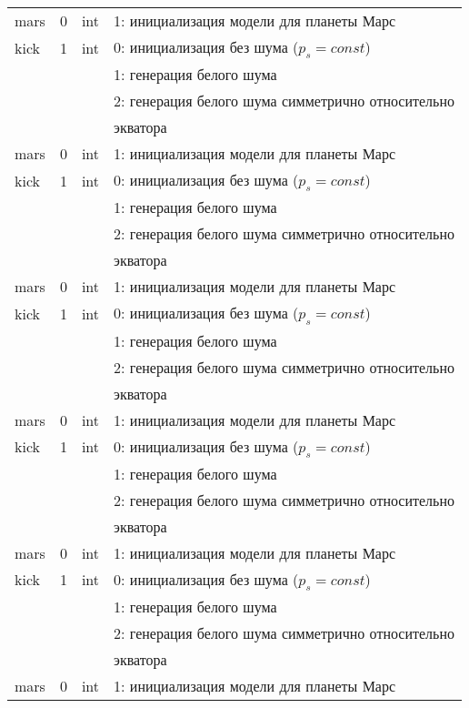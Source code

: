 \begin{longtable}[c]{|l|c|l|l|}
     mars & 0 & int & 1: инициализация модели для планеты Марс     \\
    kick & 1 & int & 0: инициализация без шума (\(p_s = const\)) \\
          &   &     & 1: генерация белого шума                  \\
          &   &     & 2: генерация белого шума симметрично относительно \\
      & & & экватора    \\
     mars & 0 & int & 1: инициализация модели для планеты Марс     \\
    kick & 1 & int & 0: инициализация без шума (\(p_s = const\)) \\
          &   &     & 1: генерация белого шума                  \\
          &   &     & 2: генерация белого шума симметрично относительно \\
      & & & экватора    \\
     mars & 0 & int & 1: инициализация модели для планеты Марс     \\
    kick & 1 & int & 0: инициализация без шума (\(p_s = const\)) \\
          &   &     & 1: генерация белого шума                  \\
          &   &     & 2: генерация белого шума симметрично относительно \\
      & & & экватора    \\
     mars & 0 & int & 1: инициализация модели для планеты Марс     \\
    kick & 1 & int & 0: инициализация без шума (\(p_s = const\)) \\
          &   &     & 1: генерация белого шума                  \\
          &   &     & 2: генерация белого шума симметрично относительно \\
      & & & экватора    \\
     mars & 0 & int & 1: инициализация модели для планеты Марс     \\
    kick & 1 & int & 0: инициализация без шума (\(p_s = const\)) \\
          &   &     & 1: генерация белого шума                  \\
          &   &     & 2: генерация белого шума симметрично относительно \\
      & & & экватора    \\
     mars & 0 & int & 1: инициализация модели для планеты Марс     \\

\end{longtable}
